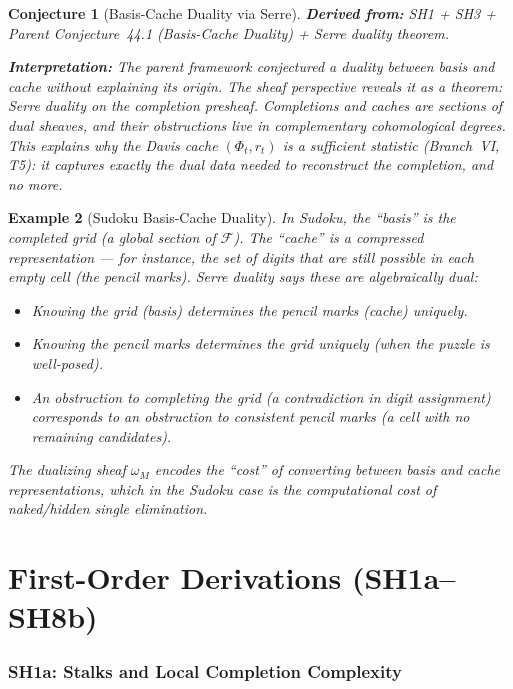 \documentclass[11pt,letterpaper]{article}
\newtheorem{conjecture}{Conjecture}[section]
\newtheorem{example}[conjecture]{Example}
\newcommand{\sheaf}{\mathcal{F}}
\begin{document}
\begin{conjecture}[Basis-Cache Duality via 
Serre]
\textbf{Derived from:} SH1 + SH3 + Parent Conjecture~44.1 
(Basis-Cache Duality) + Serre duality theorem.

\textbf{Interpretation:} The parent framework conjectured a duality 
between basis and cache without explaining its origin. The sheaf 
perspective reveals it as a \emph{theorem}: Serre duality on the 
completion presheaf. Completions and caches are sections of dual sheaves, 
and their obstructions live in complementary cohomological degrees. 
This explains why the Davis cache $(\Phi_t, r_t)$ is a sufficient 
statistic (Branch~VI, T5): it captures exactly the dual data needed 
to reconstruct the completion, and no more.
\end{conjecture}

\begin{example}[Sudoku Basis-Cache Duality]
In Sudoku, the ``basis'' is the completed grid (a global section of 
$\sheaf$). The ``cache'' is a compressed representation --- for 
instance, the set of digits that are \emph{still possible} in each 
empty cell (the pencil marks). Serre duality says these are 
algebraically dual:

\begin{itemize}
    \item Knowing the grid (basis) determines the pencil marks (cache) 
    uniquely.
    \item Knowing the pencil marks determines the grid uniquely (when 
    the puzzle is well-posed).
    \item An obstruction to completing the grid (a contradiction in 
    digit assignment) corresponds to an obstruction to consistent 
    pencil marks (a cell with no remaining candidates).
\end{itemize}

The dualizing sheaf $\omega_M$ encodes the ``cost'' of converting 
between basis and cache representations, which in the Sudoku case is 
the computational cost of naked/hidden single elimination.
\end{example}

\newpage
\part{First-Order Derivations (SH1a--SH8b)}

\section{SH1a: Stalks and Local Completion Complexity}
\end{document}
